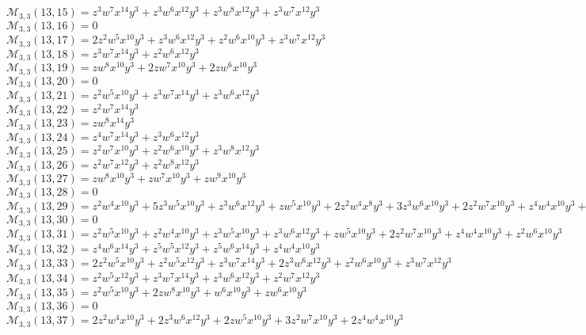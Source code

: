 $\mathcal{M}_{3,3}(13,15)=z^3w^7x^{14}y^3+z^3w^6x^{12}y^3+z^3w^8x^{12}y^3+z^3w^7x^{12}y^3$\\
$\mathcal{M}_{3,3}(13,16)=0$\\
$\mathcal{M}_{3,3}(13,17)=2z^2w^5x^{10}y^3+z^3w^6x^{12}y^3+z^2w^6x^{10}y^3+z^3w^7x^{12}y^3$\\
$\mathcal{M}_{3,3}(13,18)=z^3w^7x^{14}y^3+z^2w^6x^{12}y^3$\\
$\mathcal{M}_{3,3}(13,19)=zw^8x^{10}y^3+2zw^7x^{10}y^3+2zw^6x^{10}y^3$\\
$\mathcal{M}_{3,3}(13,20)=0$\\
$\mathcal{M}_{3,3}(13,21)=z^2w^5x^{10}y^3+z^3w^7x^{14}y^3+z^3w^6x^{12}y^3$\\
$\mathcal{M}_{3,3}(13,22)=z^2w^7x^{14}y^3$\\
$\mathcal{M}_{3,3}(13,23)=zw^8x^{14}y^3$\\
$\mathcal{M}_{3,3}(13,24)=z^4w^7x^{14}y^3+z^3w^6x^{12}y^3$\\
$\mathcal{M}_{3,3}(13,25)=z^2w^7x^{10}y^3+z^2w^6x^{10}y^3+z^3w^8x^{12}y^3$\\
$\mathcal{M}_{3,3}(13,26)=z^2w^7x^{12}y^3+z^2w^8x^{12}y^3$\\
$\mathcal{M}_{3,3}(13,27)=zw^8x^{10}y^3+zw^7x^{10}y^3+zw^9x^{10}y^3$\\
$\mathcal{M}_{3,3}(13,28)=0$\\
$\mathcal{M}_{3,3}(13,29)=z^2w^4x^{10}y^3+5z^3w^5x^{10}y^3+z^3w^6x^{12}y^3+zw^5x^{10}y^3+2z^2w^4x^8y^3+3z^3w^6x^{10}y^3+2z^2w^7x^{10}y^3+z^4w^4x^{10}y^3+z^2w^5x^8y^3$\\
$\mathcal{M}_{3,3}(13,30)=0$\\
$\mathcal{M}_{3,3}(13,31)=z^2w^5x^{10}y^3+z^2w^4x^{10}y^3+z^3w^5x^{10}y^3+z^3w^6x^{12}y^3+zw^5x^{10}y^3+2z^2w^7x^{10}y^3+z^4w^4x^{10}y^3+z^2w^6x^{10}y^3$\\
$\mathcal{M}_{3,3}(13,32)=z^4w^6x^{14}y^3+z^5w^5x^{12}y^3+z^5w^6x^{14}y^3+z^4w^4x^{10}y^3$\\
$\mathcal{M}_{3,3}(13,33)=2z^2w^5x^{10}y^3+z^2w^5x^{12}y^3+z^3w^7x^{14}y^3+2z^3w^6x^{12}y^3+z^2w^6x^{10}y^3+z^3w^7x^{12}y^3$\\
$\mathcal{M}_{3,3}(13,34)=z^2w^5x^{12}y^3+z^3w^7x^{14}y^3+z^3w^6x^{12}y^3+z^2w^7x^{12}y^3$\\
$\mathcal{M}_{3,3}(13,35)=z^2w^5x^{10}y^3+2zw^8x^{10}y^3+w^6x^{10}y^3+zw^6x^{10}y^3$\\
$\mathcal{M}_{3,3}(13,36)=0$\\
$\mathcal{M}_{3,3}(13,37)=2z^2w^4x^{10}y^3+2z^3w^6x^{12}y^3+2zw^5x^{10}y^3+3z^2w^7x^{10}y^3+2z^4w^4x^{10}y^3$\\

